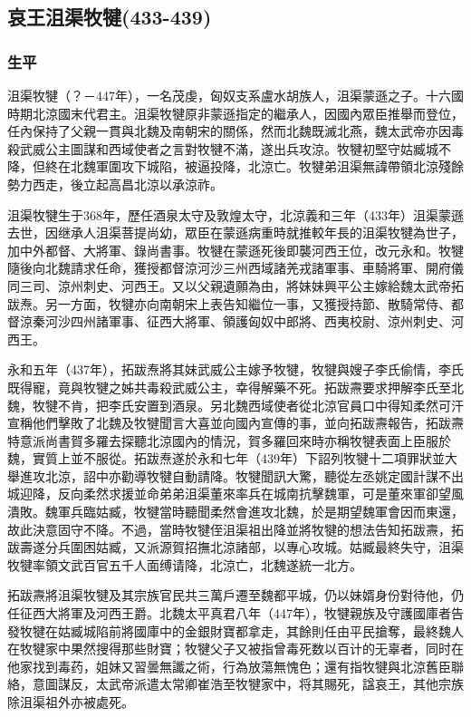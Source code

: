
\subsection{哀王沮渠牧犍\tiny(433-439)}

\subsubsection{生平}

沮渠牧犍（？－447年），一名茂虔，匈奴支系盧水胡族人，沮渠蒙遜之子。十六國時期北涼國末代君主。沮渠牧犍原非蒙遜指定的繼承人，因國內眾臣推舉而登位，任內保持了父親一貫與北魏及南朝宋的關係，然而北魏既滅北燕，魏太武帝亦因毒殺武威公主圖謀和西域使者之言對牧犍不滿，遂出兵攻涼。牧犍初堅守姑臧城不降，但終在北魏軍圍攻下城陷，被逼投降，北涼亡。牧犍弟沮渠無諱帶領北涼殘餘勢力西走，後立起高昌北涼以承涼祚。

沮渠牧犍生于368年，歷任酒泉太守及敦煌太守，北涼義和三年（433年）沮渠蒙遜去世，因继承人沮渠菩提尚幼，眾臣在蒙遜病重時就推較年長的沮渠牧犍為世子，加中外都督、大將軍、錄尚書事。牧犍在蒙遜死後即襲河西王位，改元永和。牧犍隨後向北魏請求任命，獲授都督涼河沙三州西域諸羌戎諸軍事、車騎將軍、開府儀同三司、涼州刺史、河西王。又以父親遺願為由，將妹妹興平公主嫁給魏太武帝拓跋焘。另一方面，牧犍亦向南朝宋上表告知繼位一事，又獲授持節、散騎常侍、都督涼秦河沙四州諸軍事、征西大將軍、領護匈奴中郎將、西夷校尉、涼州刺史、河西王。

永和五年（437年），拓跋焘將其妹武威公主嫁予牧犍，牧犍與嫂子李氏偷情，李氏既得寵，竟與牧犍之姊共毒殺武威公主，幸得解藥不死。拓跋燾要求押解李氏至北魏，牧犍不肯，把李氏安置到酒泉。另北魏西域使者從北涼官員口中得知柔然可汗宣稱他們擊敗了北魏及牧犍聞言大喜並向國內宣傳的事，並向拓跋燾報告，拓跋燾特意派尚書賀多羅去探聽北涼國內的情況，賀多羅回來時亦稱牧犍表面上臣服於魏，實質上並不服從。拓跋焘遂於永和七年（439年）下詔列牧犍十二項罪狀並大舉進攻北涼，詔中亦勸導牧犍自動請降。牧犍聞訊大驚，聽從左丞姚定國計謀不出城迎降，反向柔然求援並命弟弟沮渠董來率兵在城南抗擊魏軍，可是董來軍卻望風潰敗。魏軍兵臨姑臧，牧犍當時聽聞柔然會進攻北魏，於是期望魏軍會因而東還，故此決意固守不降。不過，當時牧犍侄沮渠祖出降並將牧犍的想法告知拓跋燾，拓跋壽遂分兵圍困姑臧，又派源賀招撫北涼諸部，以專心攻城。姑臧最終失守，沮渠牧犍率領文武百官五千人面缚请降，北涼亡，北魏遂統一北方。

拓跋燾將沮渠牧犍及其宗族官民共三萬戶遷至魏都平城，仍以妹婿身份對待他，仍任征西大將軍及河西王爵。北魏太平真君八年（447年），牧犍親族及守護國庫者告發牧犍在姑臧城陷前將國庫中的金銀財寶都拿走，其餘則任由平民搶奪，最終魏人在牧犍家中果然搜得那些財寶；牧犍父子又被指曾毒死数以百计的无辜者，同时在他家找到毒药，姐妹又習曇無讖之術，行為放蕩無愧色；還有指牧犍與北涼舊臣聯絡，意圖謀反，太武帝派遣太常卿崔浩至牧犍家中，将其賜死，諡哀王，其他宗族除沮渠祖外亦被處死。

